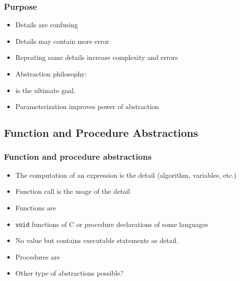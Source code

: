 \begin{frame}
 \frametitle{Purpose}
 \begin{itemize}[<+->]
  \item Details are confusing
  \item Details may contain more error
  \item Repeating same details increase complexity and errors
  \item Abstraction philosophy: 
  \item {} is the ultimate goal.
  \item Parameterization improves power of abstraction
 \end{itemize}
\end{frame}

\subsection{Function and Procedure Abstractions}
\begin{frame}
\frametitle{Function and procedure abstractions}
\begin{itemize}[<+->]
 \item The computation of an expression is the detail (algorithm, variables, etc.)
 \item Function call is the usage of the detail
 \item Functions are 
 \item \texttt{void} functions of C or  \textsf{procedure} declarations of some languages
 \item No value but contains executable statements  as detail.
 \item Procedures are  
 \item Other type of abstractions possible?
\end{itemize}
\end{frame}

